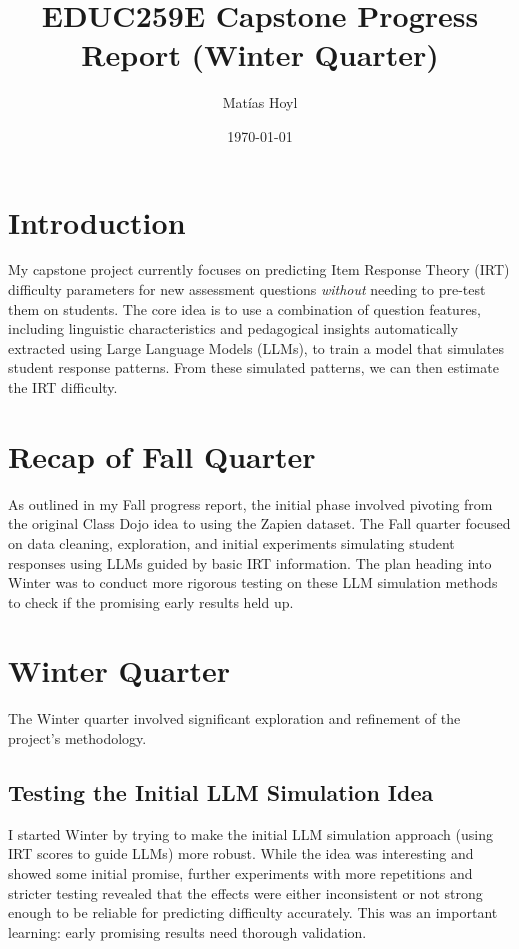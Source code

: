\documentclass[
    a4paper, %
    10pt, %
    twoside %
]{LTJournalArticle}
\title{EDUC259E Capstone Progress Report (Winter Quarter)}
\author{Matías Hoyl}
\date{\today} %
\begin{document}
\justifying %

\maketitle

\section{Introduction}

My capstone project currently focuses on predicting Item Response Theory (IRT) difficulty parameters for new assessment questions \textit{without} needing to pre-test them on students. The core idea is to use a combination of question features, including linguistic characteristics and pedagogical insights automatically extracted using Large Language Models (LLMs), to train a model that simulates student response patterns. From these simulated patterns, we can then estimate the IRT difficulty.

\section{Recap of Fall Quarter}

As outlined in my Fall progress report, the initial phase involved pivoting from the original Class Dojo idea to using the Zapien dataset. The Fall quarter focused on data cleaning, exploration, and initial experiments simulating student responses using LLMs guided by basic IRT information. The plan heading into Winter was to conduct more rigorous testing on these LLM simulation methods to check if the promising early results held up.

\section{Winter Quarter}

The Winter quarter involved significant exploration and refinement of the project's methodology.


\subsection{Testing the Initial LLM Simulation Idea}

I started Winter by trying to make the initial LLM simulation approach (using IRT scores to guide LLMs) more robust. While the idea was interesting and showed some initial promise, further experiments with more repetitions and stricter testing revealed that the effects were either inconsistent or not strong enough to be reliable for predicting difficulty accurately. This was an important learning: early promising results need thorough validation.
\end{document}
